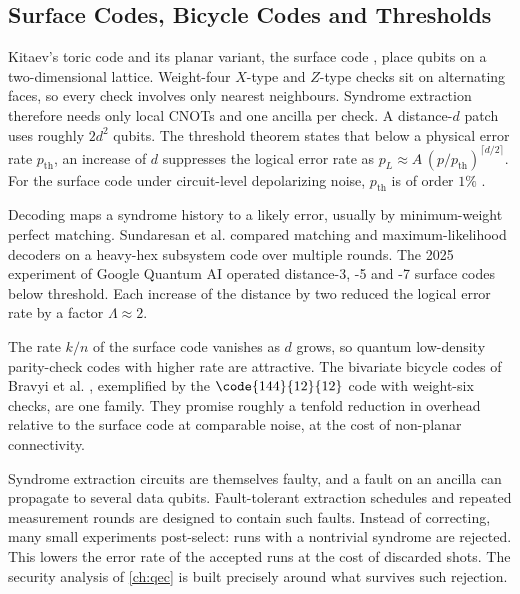 \subsection{Surface Codes, Bicycle Codes and Thresholds}

Kitaev's toric code \cite{kitaev2003anyons} and its planar variant, the surface code \cite{dennis2002topological,fowler2012surfacecodes}, place qubits on a two-dimensional lattice. Weight-four $X$-type and $Z$-type checks sit on alternating faces, so every check involves only nearest neighbours. Syndrome extraction therefore needs only local CNOTs and one ancilla per check. A distance-$d$ patch uses roughly $2d^2$ qubits. The threshold theorem states that below a physical error rate $p_{\mathrm{th}}$, an increase of $d$ suppresses the logical error rate as $p_L\approx A\,(p/p_{\mathrm{th}})^{\lceil d/2\rceil}$. For the surface code under circuit-level depolarizing noise, $p_{\mathrm{th}}$ is of order $1\%$ \cite{fowler2012surfacecodes}.

Decoding maps a syndrome history to a likely error, usually by minimum-weight perfect matching. Sundaresan et al. \cite{sundaresan2023subsystem} compared matching and maximum-likelihood decoders on a heavy-hex subsystem code over multiple rounds. The 2025 experiment of Google Quantum AI \cite{acharya2025belowthreshold} operated distance-3, -5 and -7 surface codes below threshold. Each increase of the distance by two reduced the logical error rate by a factor $\Lambda\approx2$.

The rate $k/n$ of the surface code vanishes as $d$ grows, so quantum low-density parity-check codes with higher rate are attractive. The bivariate bicycle codes of Bravyi et al. \cite{bravyi2024bicycle}, exemplified by the $\code{144}{12}{12}$ code with weight-six checks, are one family. They promise roughly a tenfold reduction in overhead relative to the surface code at comparable noise, at the cost of non-planar connectivity.

Syndrome extraction circuits are themselves faulty, and a fault on an ancilla can propagate to several data qubits. Fault-tolerant extraction schedules and repeated measurement rounds are designed to contain such faults. Instead of correcting, many small experiments post-select: runs with a nontrivial syndrome are rejected. This lowers the error rate of the accepted runs at the cost of discarded shots. The security analysis of \cref{ch:qec} \cite{guo2026qecaudit} is built precisely around what survives such rejection.

